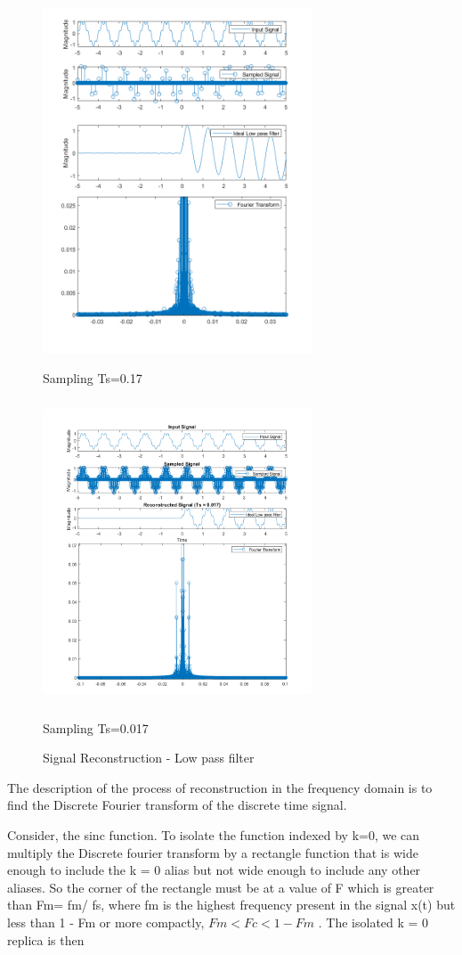 \documentclass{article}
\begin{document}
    \begin{figure}[!htb]
          \includegraphics[width=8cm]{figures/Ideal_Low_Pass_Filter_0.17.png}
          \caption{Sampling Ts=0.17}
        \endminipage\hfill
          \includegraphics[width=8cm, height=9cm]{figures/Ideal_Low_Pass_Filter_0.017.png}
          \caption{Sampling Ts=0.017}
        \endminipage\hfill
        \caption{Signal Reconstruction - Low pass filter}
    \end{figure}

The description of the process of reconstruction in the frequency domain is to find the Discrete Fourier transform of the discrete time signal. 

Consider, the sinc function. To isolate the function indexed by k=0, we can multiply the Discrete fourier transform by a rectangle function that is wide enough to include the k = 0 alias but not wide enough to include any other aliases. So the corner of the rectangle must be at a value of F which is greater than Fm= fm/ fs, where fm is the highest frequency present in the signal x(t) but less than 1 - Fm or more compactly, $ Fm< Fc<1 - Fm$ . The isolated k = 0 replica is then
\end{document}
